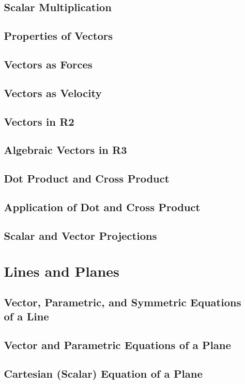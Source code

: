 \documentclass[14pt]{article}
\begin{document}
        \subsection{Scalar Multiplication}
        \subsection{Properties of Vectors}
        \subsection{Vectors as Forces}
        \subsection{Vectors as Velocity}
        \subsection{Vectors in R2}
        \subsection{Algebraic Vectors in R3}
        \subsection{Dot Product and Cross Product}
        \subsection{Application of Dot and Cross Product}
        \subsection{Scalar and Vector Projections}

    \section{Lines and Planes}
        \subsection{Vector, Parametric, and Symmetric Equations of a Line}
        \subsection{Vector and Parametric Equations of a Plane}
        \subsection{Cartesian (Scalar) Equation of a Plane}
\end{document}
